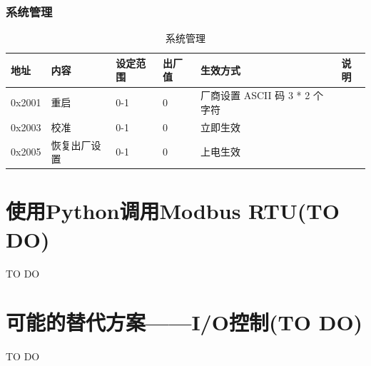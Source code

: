 \documentclass[UTF8]{ctexart}
\begin{document}
\subsubsection{系统管理}
\begin{table}[h]
\centering
\caption{系统管理}
\label{tab:system_management}
\begin{tabular}{|l|l|l|l|l|l|}
\hline
\textbf{地址} & \textbf{内容} & \textbf{设定范围} & \textbf{出厂值} & \textbf{生效方式} & \textbf{说明} \\ \hline
0x2001 & 重启 & 0-1 & 0 & 厂商设置 ASCII 码 3 * 2 个字符 &  \\ \hline
0x2003 & 校准 & 0-1 & 0 & 立即生效 &  \\ \hline
0x2005 & 恢复出厂设置 & 0-1 & 0 & 上电生效 &  \\ \hline
\end{tabular}
\end{table}
\section{使用Python调用Modbus RTU(TO DO)}
TO DO

\section{可能的替代方案——I/O控制(TO DO)}
TO DO
\end{document}
